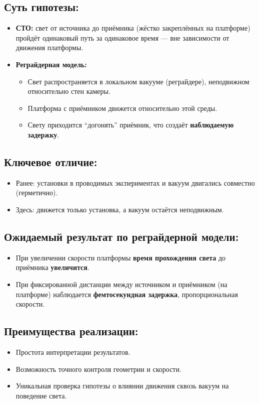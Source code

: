 \documentclass[12pt]{article}
\begin{document}
\subsection*{Суть гипотезы:}
\begin{itemize}
    \item \textbf{СТО:} свет от источника до приёмника (жёстко закреплённых на платформе) пройдёт одинаковый путь за одинаковое время — вне зависимости от движения платформы.
    \item \textbf{Реграйдерная модель:}
    \begin{itemize}
        \item Свет распространяется в локальном вакууме (реграйдере), неподвижном относительно стен камеры.
        \item Платформа с приёмником движется относительно этой среды.
        \item Свету приходится “догонять” приёмник, что создаёт \textbf{наблюдаемую задержку}.
    \end{itemize}
\end{itemize}

\subsection*{Ключевое отличие:}
\begin{itemize}
    \item Ранее: установки в проводимых экспериментах и вакуум двигались совместно (герметично).
    \item Здесь: движется только установка, а вакуум остаётся неподвижным.
\end{itemize}

\subsection*{Ожидаемый результат по реграйдерной модели:}
\begin{itemize}
    \item При увеличении скорости платформы \textbf{время прохождения света} до приёмника \textbf{увеличится}.
    \item При фиксированной дистанции между источником и приёмником (на платформе) наблюдается \textbf{фемтосекундная задержка}, пропорциональная скорости.
\end{itemize}

\subsection*{Преимущества реализации:}
\begin{itemize}
    \item Простота интерпретации результатов.
    \item Возможность точного контроля геометрии и скорости.
    \item Уникальная проверка гипотезы о влиянии движения сквозь вакуум на поведение света.
\end{itemize}
\end{document}
